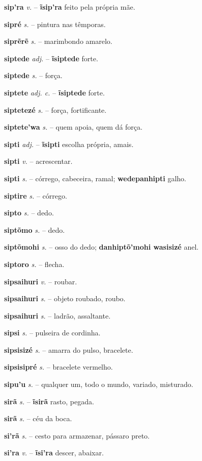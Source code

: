 \textbf{sip'ra} \textit{v.} -- \textbf{ĩsip'ra} feito pela própria mãe.

\textbf{sipré} \textit{s.} -- pintura nas têmporas.

\textbf{siprẽrẽ} \textit{s.} -- marimbondo amarelo.

\textbf{siptede} \textit{adj.} -- \textbf{ĩsiptede} forte.

\textbf{siptede} \textit{s.} -- força.

\textbf{siptete} \textit{adj. c.} -- \textbf{ĩsiptede} forte.

\textbf{siptetezé} \textit{s.} -- força, fortificante.

\textbf{siptete'wa} \textit{s.} -- quem apoia, quem dá força.

\textbf{sipti} \textit{adj.} -- \textbf{ĩsipti} escolha própria, amais.

\textbf{sipti} \textit{v.} -- acrescentar.

\textbf{sipti} \textit{s.} -- córrego, cabeceira, ramal; \textbf{wedepanhipti} galho.

\textbf{siptire} \textit{s.} -- córrego.

\textbf{sipto} \textit{s.} -- dedo.

\textbf{siptõmo} \textit{s.} -- dedo.

\textbf{siptõmohi} \textit{s.} -- osso do dedo; \textbf{danhiptõ'mohi wasisizé} anel.

\textbf{siptoro} \textit{s.} -- flecha.

\textbf{sipsaihuri} \textit{v.} -- roubar.

\textbf{sipsaihuri} \textit{s.} -- objeto roubado, roubo.

\textbf{sipsaihuri} \textit{s.} -- ladrão, assaltante.

\textbf{sipsi} \textit{s.} -- pulseira de cordinha.

\textbf{sipsisizé} \textit{s.} -- amarra do pulso, bracelete.

\textbf{sipsisipré} \textit{s.} -- bracelete vermelho.

\textbf{sipu'u} \textit{s.} -- qualquer um, todo o mundo, variado, misturado.

\textbf{sirã} \textit{s.} -- \textbf{ĩsirã} rasto, pegada.

\textbf{sirã} \textit{s.} -- céu da boca.

\textbf{si'rã} \textit{s.} -- cesto para armazenar, pássaro preto.

\textbf{si'ra} \textit{v.} -- \textbf{ĩsi'ra} descer, abaixar.

